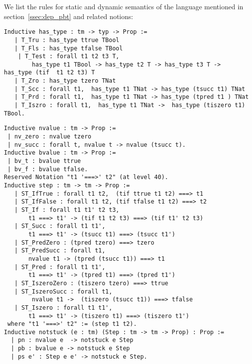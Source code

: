 We list the rules for static and dynamic semantics of the language mentioned in section~\ref{ssec:dep_pbt} and related notions:
\begin{lstlisting}
Inductive has_type : tm -> typ -> Prop :=
   | T_Tru : has_type ttrue TBool
   | T_Fls : has_type tfalse TBool
    | T_Test : forall t1 t2 t3 T,
        has_type t1 TBool -> has_type t2 T -> has_type t3 T ->  has_type (tif  t1 t2 t3) T 
   | T_Zro : has_type tzero TNat
   | T_Scc : forall t1,  has_type t1 TNat -> has_type (tsucc t1) TNat
   | T_Prd : forall t1,  has_type t1 TNat -> has_type (tpred t1 ) TNat
   | T_Iszro : forall t1,  has_type t1 TNat ->  has_type (tiszero t1) TBool.
\end{lstlisting}

\begin{lstlisting}
Inductive nvalue : tm -> Prop :=
 | nv_zero : nvalue tzero
 | nv_succ : forall t, nvalue t -> nvalue (tsucc t).
Inductive bvalue : tm -> Prop :=
 | bv_t : bvalue ttrue
 | bv_f : bvalue tfalse. 
Reserved Notation "t1 '===>' t2" (at level 40).
Inductive step : tm -> tm -> Prop :=
   | ST_IfTrue : forall t1 t2,  (tif ttrue t1 t2) ===> t1
   | ST_IfFalse : forall t1 t2, (tif tfalse t1 t2) ===> t2
   | ST_If : forall t1 t1' t2 t3,
       t1 ===> t1' -> (tif t1 t2 t3) ===> (tif t1' t2 t3)
   | ST_Succ : forall t1 t1',
       t1 ===> t1' -> (tsucc t1) ===> (tsucc t1')
   | ST_PredZero : (tpred tzero) ===> tzero
   | ST_PredSucc : forall t1,
       nvalue t1 -> (tpred (tsucc t1)) ===> t1
   | ST_Pred : forall t1 t1',
       t1 ===> t1' -> (tpred t1) ===> (tpred t1')
   | ST_IszeroZero : (tiszero tzero) ===> ttrue
   | ST_IszeroSucc : forall t1,
        nvalue t1 ->  (tiszero (tsucc t1)) ===> tfalse
   | ST_Iszero : forall t1 t1',
       t1 ===> t1' -> (tiszero t1) ===> (tiszero t1')
 where "t1 '===>' t2" := (step t1 t2).
Inductive notstuck (e : tm) (Step : tm -> tm -> Prop) : Prop :=
  | pn : nvalue e  -> notstuck e Step
  | pb : bvalue e -> notstuck e Step
  | ps e' : Step e e' -> notstuck e Step.
\end{lstlisting}

